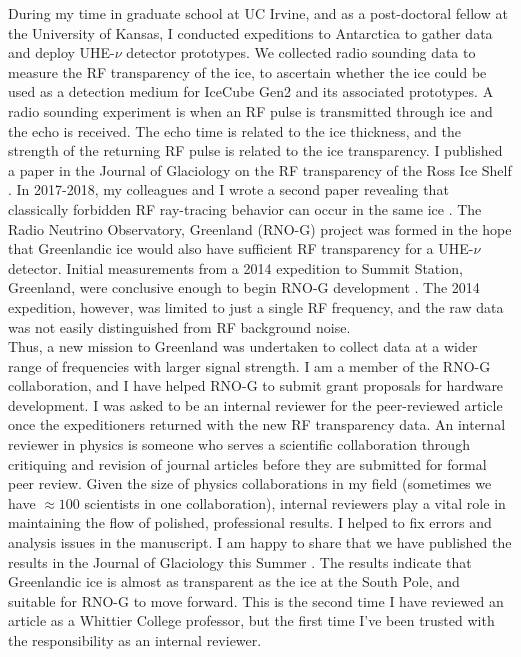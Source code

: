 \documentclass[../../../main.tex]{subfiles}
\begin{document}
During my time in graduate school at UC Irvine, and as a post-doctoral fellow at the University of Kansas, I conducted expeditions to Antarctica to gather data and deploy UHE-$\nu$ detector prototypes.  We collected radio sounding data to measure the RF transparency of the ice, to ascertain whether the ice could be used as a detection medium for IceCube Gen2 and its associated prototypes.  A radio sounding experiment is when an RF pulse is transmitted through ice and the echo is received.  The echo time is related to the ice thickness, and the strength of the returning RF pulse is related to the ice transparency.  I published a paper in the Journal of Glaciology on the RF transparency of the Ross Ice Shelf \cite{10.3189/2015jog14j214}.  In 2017-2018, my colleagues and I wrote a second paper revealing that classically forbidden RF ray-tracing behavior can occur in the same ice \cite{Barwick:2018497}.  The Radio Neutrino Observatory, Greenland (RNO-G) project was formed in the hope that Greenlandic ice would also have sufficient RF transparency for a UHE-$\nu$ detector.  Initial measurements from a 2014 expedition to Summit Station, Greenland, were conclusive enough to begin RNO-G development \cite{10.3189/2015jog15j057}.  The 2014 expedition, however, was limited to just a single RF frequency, and the raw data was not easily distinguished from RF background noise.
\\
\vspace{0.25cm}
Thus, a new mission to Greenland was undertaken to collect data at a wider range of frequencies with larger signal strength.  I am a member of the RNO-G collaboration, and I have helped RNO-G to submit grant proposals for hardware development.  I was asked to be an internal reviewer for the peer-reviewed article once the expeditioners returned with the new RF transparency data.  An internal reviewer in physics is someone who serves a scientific collaboration through critiquing and revision of journal articles before they are submitted for formal peer review.  Given the size of physics collaborations in my field (sometimes we have $\approx 100$ scientists in one collaboration), internal reviewers play a vital role in maintaining the flow of polished, professional results.  I helped to fix errors and analysis issues in the manuscript.  I am happy to share that we have published the results in the Journal of Glaciology this Summer \cite{aguilar_2022}.  The results indicate that Greenlandic ice is almost as transparent as the ice at the South Pole, and suitable for RNO-G to move forward.  This is the second time I have reviewed an article as a Whittier College professor, but the first time I've been trusted with the responsibility as an internal reviewer.
\end{document}
